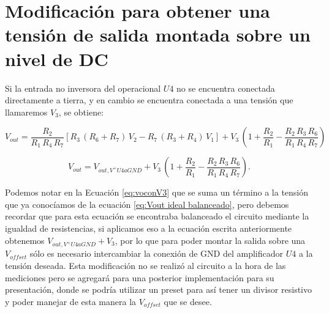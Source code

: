 \documentclass[11pt, a4paper]{article}
\begin{document}
\section{Modificación para obtener una tensión de salida montada sobre un nivel de DC}
	Si la entrada no inversora del operacional $\mathit{U4}$ no se encuentra conectada directamente a tierra, y en cambio se encuentra conectada a una tensión que llamaremos $V_3$, se obtiene:
	
\begin{equation}
V_{out} = \dfrac{R_2}{R_1 \, R_4 \, R_7} [R_3 \, (R_6 + R_7) \,V_2 - R_7 \, (R_3 + R_4) \,V_1] + V_3 \, \left( 1 + \dfrac{R_2}{R_1} - \dfrac{R_2 \, R_3 \, R_6}{R_1 \, R_4 \, R_7}\right)
\label{eq:voconV3}
\end{equation}

\begin{equation}
V_{out} = V_{out,V^+U4aGND} +  V_3 \, \left( 1 + \dfrac{R_2}{R_1} - \dfrac{R_2 \, R_3 \, R_6}{R_1 \, R_4 \, R_7}\right).
\end{equation}
	
	Podemos notar en la Ecuación \ref{eq:voconV3} que se suma un término a la tensión que ya conocíamos de la ecuación \ref{eq:Vout ideal balanceado}, pero debemos recordar que para esta ecuación se encontraba balanceado el circuito mediante la igualdad de resistencias, si aplicamos eso a la ecuación escrita anteriormente obtenemos $V_{out,V^+U4aGND} +  V_3$, por lo que para poder montar la salida sobre una $V_{offset}$ sólo es necesario intercambiar la conexión de GND del amplificador $\mathit{U4}$ a la tensión deseada.
	Esta modificación no se realizó al circuito a la hora de las mediciones pero se agregará para una posterior implementación para su presentación, donde se podría utilizar un preset para así tener un divisor resistivo y poder manejar de esta manera la $V_{offset}$ que se desee.
	
\end{document}
